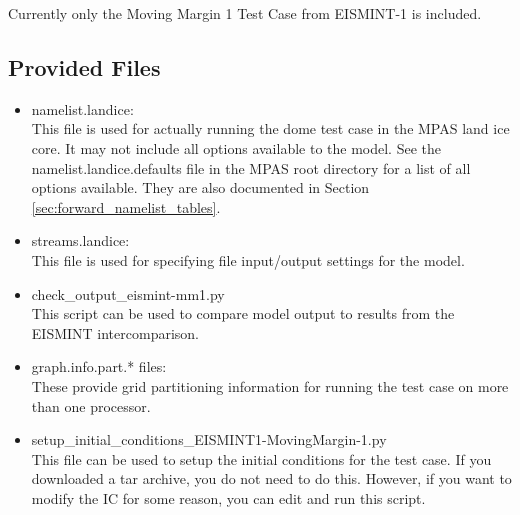 Currently only the Moving Margin 1 Test Case from EISMINT-1 is included.


\subsection{Provided Files}
\label{subsec:eismint_files}


\begin{itemize}
\item namelist.landice: \\
	This file is used for actually running the dome test case in the MPAS land ice core.  It may not include all options available to the model.  See the namelist.landice.defaults file in the MPAS root directory for a list of all options available.  They are also documented in Section \ref{sec:forward_namelist_tables}.

\item streams.landice: \\
	This file is used for specifying file input/output settings for the model.

\item check\_output\_eismint-mm1.py \\
This script can be used to compare model output to results from the EISMINT intercomparison.


\item graph.info.part.* files: \\ 
		These provide grid partitioning information for running the test case on more than one processor.  

\item setup\_initial\_conditions\_EISMINT1-MovingMargin-1.py \\
This file can be used to setup the initial conditions for the test case.  If you downloaded a tar archive, you do not need to do this.  However, if you want to modify the IC for some reason, you can edit and run this script.

\end{itemize}

